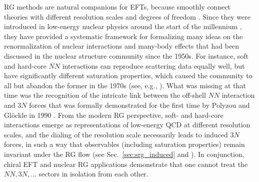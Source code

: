 RG methods are natural companions for
EFTs, because smoothly connect theories with different resolution scales 
and degrees of freedom \cite{Lepage:1989hf,Lepage:1997py}. Since they 
were introduced in low-energy nuclear physics around the start 
of the millennium \cite{Bogner:2003os,Bogner:2007od,Bogner:2010pq,Furnstahl:2013zt}, 
they have provided a systematic framework for formalizing many ideas on the 
renormalization of nuclear interactions and many-body effects that had been 
discussed in the nuclear structure community since the 1950s. For instance,
soft and hard-core $NN$ interactions can reproduce scattering data equally
well, but have significantly different saturation properties, which caused
the community to all but abandon the former in the 1970s (see, e.g., \cite{Bethe:1971qf}). 
What was missing at that time was the recognition 
of the intricate link between the off-shell $NN$ interaction and $3N$ forces 
that was formally demonstrated for the first time by Polyzou and Gl\"ockle in 1990 \cite{Polyzou:1990fk}.
From the modern RG perspective, soft- and hard-core interactions emerge
as representations of low-energy QCD at different resolution scales, 
and the dialing of the resolution scale necessarily leads to induced
$3N$ forces, in such a way that observables (including saturation
properties) remain invariant under the RG flow (see Sec.~\ref{sec:srg_induced} 
and \cite{Bogner:2010pq,Furnstahl:2013zt}). In conjunction, chiral EFT
and nuclear RG applications demonstrate that one cannot treat the $NN, 3N, \ldots$
sectors in isolation from each other.

